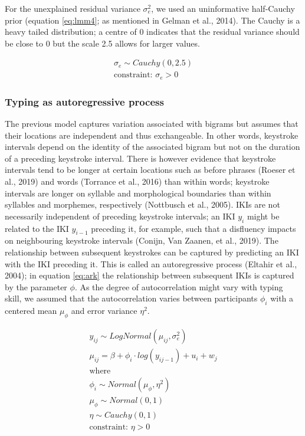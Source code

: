 \documentclass[
  english,
  man,mask,floatsintext]{apa7}
\begin{document}
For the unexplained residual variance \(\sigma_e^2\), we used an uninformative half-Cauchy prior (equation \ref{eq:lmm4}; as mentioned in Gelman et al., 2014). The Cauchy is a heavy tailed distribution; a centre of 0 indicates that the residual variance should be close to 0 but the scale 2.5 allows for larger values.

\begin{equation}
\begin{aligned}
\label{eq:lmm4}
\sigma_e \sim Cauchy(0,2.5)\\
\text{constraint: }\sigma_e>0 
\end{aligned}
\end{equation}

\hypertarget{typing-as-autoregressive-process}{%
\subsubsection{Typing as autoregressive process}\label{typing-as-autoregressive-process}}

The previous model captures variation associated with bigrams but assumes that their locations are independent and thus exchangeable. In other words, keystroke intervals depend on the identity of the associated bigram but not on the duration of a preceding keystroke interval. There is however evidence that keystroke intervals tend to be longer at certain locations such as before phrases (Roeser et al., 2019) and words (Torrance et al., 2016) than within words; keystroke intervals are longer on syllable and morphological boundaries than within syllables and morphemes, respectively (Nottbusch et al., 2005). IKIs are not necessarily independent of preceding keystroke intervals; an IKI \(y_{i}\) might be related to the IKI \(y_{i-1}\) preceding it, for example, such that a disfluency impacts on neighbouring keystroke intervals (Conijn, Van Zaanen, et al., 2019). The relationship between subsequent keystrokes can be captured by predicting an IKI with the IKI preceding it. This is called an autoregressive process (Eltahir et al., 2004); in equation \ref{eq:ark} the relationship between subsequent IKIs is captured by the parameter \(\phi\). As the degree of autocorrelation might vary with typing skill, we assumed that the autocorrelation varies between participants \(\phi_i\) with a centered mean \(\mu_{\phi}\) and error variance \(\eta^2\).

\begin{equation}
\begin{aligned}
\label{eq:ark}
y_{ij} \sim LogNormal(\mu_{ij}, \sigma_e^2)\\
\mu_{ij} = \beta + \phi_i \cdot log(y_{ij-1}) + u_i + w_j\\
\text{where}\\
\phi_i \sim Normal(\mu_{\phi}, \eta^2)\\
\mu_{\phi} \sim Normal(0, 1)\\
\eta \sim Cauchy(0, 1)\\
\text{constraint: }\eta >0 
\end{aligned}
\end{equation}
\end{document}
